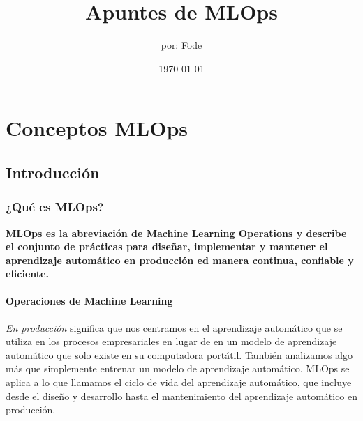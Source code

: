 \documentclass[10pt]{book}
\title{Apuntes de MLOps} %
\author{por: Fode} %
\date{\today} %
\begin{document}
\maketitle %

\chapter{Conceptos MLOps}

\section{Introducción}

\subsection{¿Qué es MLOps?}

\begin{center}
    \textbf{MLOps es la abreviación de Machine Learning Operations y describe el conjunto de prácticas para diseñar, implementar y mantener el aprendizaje automático en producción ed manera continua, confiable y eficiente.}
\end{center}

\subsubsection{Operaciones de Machine Learning}
\textit{En producción} significa que nos centramos en el aprendizaje automático que se utiliza en los procesos empresariales en lugar de en un modelo de aprendizaje automático que solo existe en su computadora portátil. También analizamos algo más que simplemente entrenar un modelo de aprendizaje automático. MLOps se aplica a lo que llamamos el ciclo de vida del aprendizaje automático, que incluye desde el diseño y desarrollo hasta el mantenimiento del aprendizaje automático en producción.
\end{document}
